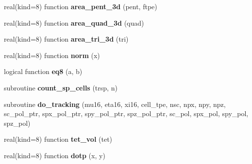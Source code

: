 \begin{DoxyCompactItemize}
\item 
\hypertarget{classsct__module_a111d3cf1cb8c5090ca34e2dbaa5b8905}{real(kind=8) function {\bfseries area\+\_\+pent\+\_\+3d} (pent, ftpe)}\label{classsct__module_a111d3cf1cb8c5090ca34e2dbaa5b8905}

\item 
\hypertarget{classsct__module_a025eb7c029104b3858e557cee5b12121}{real(kind=8) function {\bfseries area\+\_\+quad\+\_\+3d} (quad)}\label{classsct__module_a025eb7c029104b3858e557cee5b12121}

\item 
\hypertarget{classsct__module_a0f3c4e2a28f70b484ef26970a52a76e8}{real(kind=8) function {\bfseries area\+\_\+tri\+\_\+3d} (tri)}\label{classsct__module_a0f3c4e2a28f70b484ef26970a52a76e8}

\item 
\hypertarget{classsct__module_aec862dbf2e4e80f17db53cd8306bbed7}{real(kind=8) function {\bfseries norm} (x)}\label{classsct__module_aec862dbf2e4e80f17db53cd8306bbed7}

\item 
\hypertarget{classsct__module_a59a3cd06ec53359e8cd47e366b243b92}{logical function {\bfseries eq8} (a, b)}\label{classsct__module_a59a3cd06ec53359e8cd47e366b243b92}

\item 
\hypertarget{classsct__module_a19d4913fc9ef994f20e23a20dd881ff0}{subroutine {\bfseries count\+\_\+sp\+\_\+cells} (trsp, n)}\label{classsct__module_a19d4913fc9ef994f20e23a20dd881ff0}

\item 
\hypertarget{classsct__module_a0044302864c5b5ac14b1fc1ec7670e14}{subroutine {\bfseries do\+\_\+tracking} (mu16, eta16, xi16, cell\+\_\+tpe, nsc, npx, npy, npz, sc\+\_\+pol\+\_\+ptr, spx\+\_\+pol\+\_\+ptr, spy\+\_\+pol\+\_\+ptr, spz\+\_\+pol\+\_\+ptr, sc\+\_\+pol, spx\+\_\+pol, spy\+\_\+pol, spz\+\_\+pol)}\label{classsct__module_a0044302864c5b5ac14b1fc1ec7670e14}

\item 
\hypertarget{classsct__module_ae2cb787125f2e72b125cc4b2d8c2bf51}{real(kind=8) function {\bfseries tet\+\_\+vol} (tet)}\label{classsct__module_ae2cb787125f2e72b125cc4b2d8c2bf51}

\item 
\hypertarget{classsct__module_a6cf216a96528fa5d45fe618a558e6743}{real(kind=8) function {\bfseries dotp} (x, y)}\label{classsct__module_a6cf216a96528fa5d45fe618a558e6743}


\end{DoxyCompactItemize}
